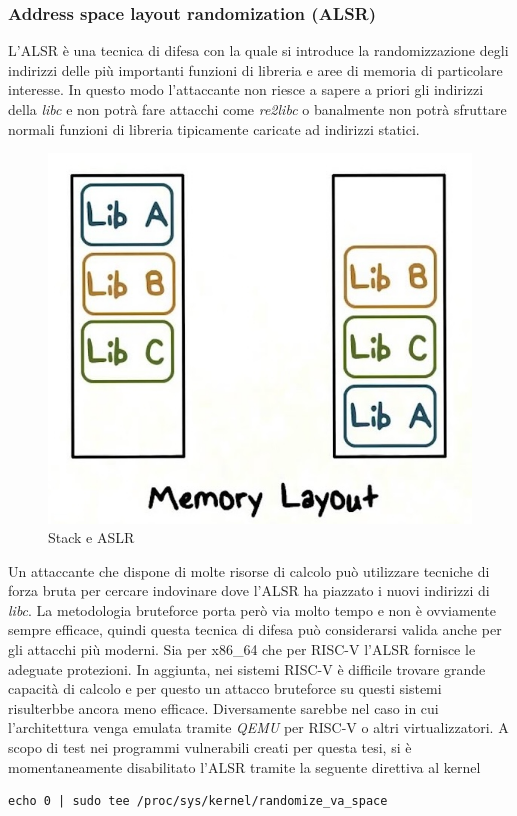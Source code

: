 \subsubsection*{Address space layout randomization (ALSR)}
L'ALSR è una tecnica di difesa con la quale si introduce la randomizzazione degli indirizzi delle più importanti funzioni di libreria e aree di memoria di particolare interesse. In questo modo l'attaccante non riesce a sapere a priori gli indirizzi della \textit{libc} e non potrà fare attacchi come \textit{re2libc} o banalmente non potrà sfruttare normali funzioni di libreria tipicamente caricate ad indirizzi statici.
\vspace{1cm}
\FloatBarrier
\begin{figure}[!htbp]
    \centering
    \includegraphics[width=0.7\linewidth]{images/alsr.jpg}
    \caption{Stack e ASLR}
\end{figure}
\FloatBarrier
\vspace{1cm}
Un attaccante che dispone di molte risorse di calcolo può utilizzare tecniche di forza bruta per cercare indovinare dove l'ALSR ha piazzato i nuovi indirizzi di \textit{libc}. La metodologia bruteforce porta però via molto tempo e non è ovviamente sempre efficace, quindi questa tecnica di difesa può considerarsi valida anche per gli attacchi più moderni. Sia per x86\_64 che per RISC-V l'ALSR fornisce le adeguate protezioni. In aggiunta, nei sistemi RISC-V è difficile trovare grande capacità di calcolo e per questo un attacco bruteforce su questi sistemi risulterbbe ancora meno efficace. Diversamente sarebbe nel caso in cui l'architettura venga emulata tramite \textit{QEMU} \cite{QemuRISCV} per RISC-V o altri virtualizzatori.
\newline
A scopo di test nei programmi vulnerabili creati per questa tesi, si è momentaneamente disabilitato l'ALSR tramite la seguente direttiva al kernel 
\begin{verbatim}
echo 0 | sudo tee /proc/sys/kernel/randomize_va_space
\end{verbatim}
